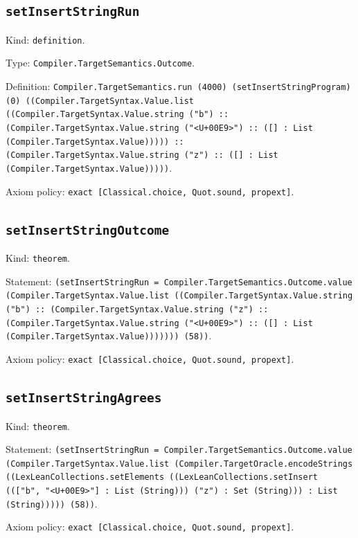 \documentclass[11pt]{article}
\begin{document}
\subsection*{\texttt{setInsertStringRun}}
\noindent Kind: \texttt{definition}.\par
\noindent Type: \texttt{Compiler.TargetSemantics.Outcome}.\par
\noindent Definition: \texttt{Compiler.TargetSemantics.run (4000) (setInsertStringProgram) (0) ((Compiler.TargetSyntax.Value.list ((Compiler.TargetSyntax.Value.string ("b") :: (Compiler.TargetSyntax.Value.string ("<U+00E9>") :: ([] : List (Compiler.TargetSyntax.Value))))) :: (Compiler.TargetSyntax.Value.string ("z") :: ([] : List (Compiler.TargetSyntax.Value)))))}.\par
\noindent Axiom policy: \texttt{exact [Classical.choice, Quot.sound, propext]}.\par
\subsection*{\texttt{setInsertStringOutcome}}
\noindent Kind: \texttt{theorem}.\par
\noindent Statement: \texttt{(setInsertStringRun = Compiler.TargetSemantics.Outcome.value (Compiler.TargetSyntax.Value.list ((Compiler.TargetSyntax.Value.string ("b") :: (Compiler.TargetSyntax.Value.string ("z") :: (Compiler.TargetSyntax.Value.string ("<U+00E9>") :: ([] : List (Compiler.TargetSyntax.Value))))))) (58))}.\par
\noindent Axiom policy: \texttt{exact [Classical.choice, Quot.sound, propext]}.\par
\subsection*{\texttt{setInsertStringAgrees}}
\noindent Kind: \texttt{theorem}.\par
\noindent Statement: \texttt{(setInsertStringRun = Compiler.TargetSemantics.Outcome.value (Compiler.TargetSyntax.Value.list (Compiler.TargetOracle.encodeStrings ((LexLeanCollections.setElements ((LexLeanCollections.setInsert ((["b", "<U+00E9>"] : List (String))) ("z") : Set (String))) : List (String))))) (58))}.\par
\noindent Axiom policy: \texttt{exact [Classical.choice, Quot.sound, propext]}.\par
\end{document}

